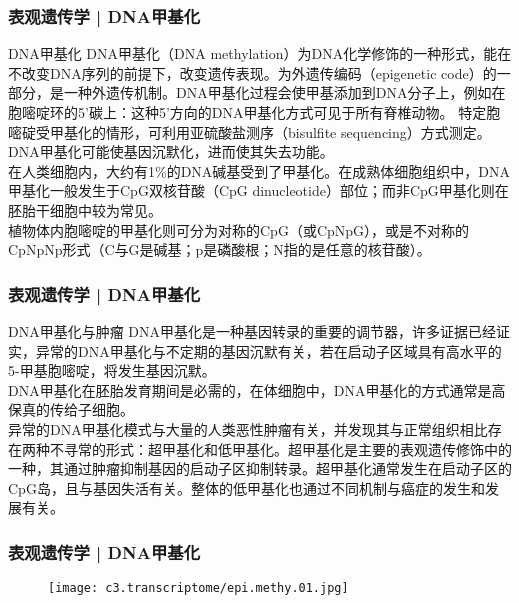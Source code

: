 \begin{frame}
  \frametitle{表观遗传学 | DNA甲基化}
  \begin{block}{DNA甲基化}
    DNA甲基化（DNA methylation）为DNA化学修饰的一种形式，能在不改变DNA序列的前提下，改变遗传表现。为外遗传编码（epigenetic code）的一部分，是一种外遗传机制。DNA甲基化过程会使甲基添加到DNA分子上，例如在胞嘧啶环的5'碳上：这种5'方向的DNA甲基化方式可见于所有脊椎动物。 特定胞嘧碇受甲基化的情形，可利用亚硫酸盐测序（bisulfite sequencing）方式测定。DNA甲基化可能使基因沉默化，进而使其失去功能。\\
    \vspace{0.5em}
    在人类细胞内，大约有1\%的DNA碱基受到了甲基化。在成熟体细胞组织中，DNA甲基化一般发生于CpG双核苷酸（CpG dinucleotide）部位；而非CpG甲基化则在胚胎干细胞中较为常见。\\
    \vspace{0.5em}
    植物体内胞嘧啶的甲基化则可分为对称的CpG（或CpNpG），或是不对称的CpNpNp形式（C与G是碱基；p是磷酸根；N指的是任意的核苷酸）。
  \end{block}
\end{frame}

\begin{frame}
  \frametitle{表观遗传学 | DNA甲基化}
  \begin{block}{DNA甲基化与肿瘤}
 DNA甲基化是一种基因转录的重要的调节器，许多证据已经证实，异常的DNA甲基化与不定期的基因沉默有关，若在启动子区域具有高水平的5-甲基胞嘧啶，将发生基因沉默。\\
 \vspace{0.5em}
DNA甲基化在胚胎发育期间是必需的，在体细胞中，DNA甲基化的方式通常是高保真的传给子细胞。\\
 \vspace{0.5em}
异常的DNA甲基化模式与大量的人类恶性肿瘤有关，并发现其与正常组织相比存在两种不寻常的形式：超甲基化和低甲基化。超甲基化是主要的表观遗传修饰中的一种，其通过肿瘤抑制基因的启动子区抑制转录。超甲基化通常发生在启动子区的CpG岛，且与基因失活有关。整体的低甲基化也通过不同机制与癌症的发生和发展有关。 
  \end{block}
\end{frame}

\begin{frame}
  \frametitle{表观遗传学 | DNA甲基化}
  \begin{figure}
    \centering
    \texttt{[image: c3.transcriptome/epi.methy.01.jpg]}
  \end{figure}
\end{frame}

